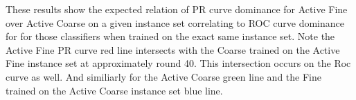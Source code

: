 \documentclass[ms]{nuthesis}
\begin{document}
\par These results show the expected
  relation of PR curve dominance for Active Fine over Active Coarse on a given instance set correlating
  to ROC curve dominance for for those classifiers when trained on the exact same instance set.
  Note the Active Fine PR curve red line intersects with the Coarse
    trained on the Active Fine instance set at approximately round 40. This intersection occurs
    on the Roc curve as well. And similiarly for the Active Coarse green line and the Fine
     trained on the Active Coarse instance set blue line.

%



\clearpage
\end{document}
